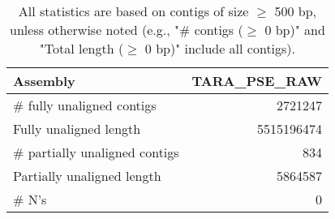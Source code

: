 \documentclass[12pt,a4paper]{article}
\begin{document}
\begin{table}[ht]
\begin{center}
\caption{All statistics are based on contigs of size $\geq$ 500 bp, unless otherwise noted (e.g., "\# contigs ($\geq$ 0 bp)" and "Total length ($\geq$ 0 bp)" include all contigs).}
\begin{tabular}{|l*{1}{|r}|}
\hline
Assembly & TARA\_PSE\_RAW \\ \hline
\# fully unaligned contigs & 2721247 \\ \hline
Fully unaligned length & 5515196474 \\ \hline
\# partially unaligned contigs & 834 \\ \hline
Partially unaligned length & 5864587 \\ \hline
\# N's & 0 \\ \hline
\end{tabular}
\end{center}
\end{table}
\end{document}
